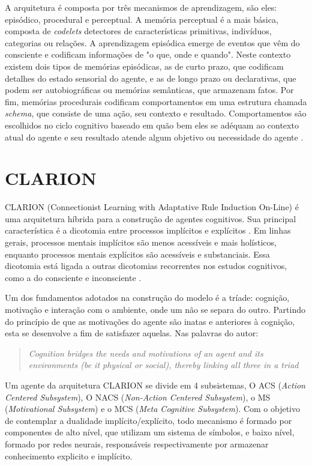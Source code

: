 A arquitetura é composta por três mecanismos de aprendizagem, são eles: episódico, procedural e perceptual. A memória perceptual é a mais básica, composta de \textit{codelets} detectores de características primitivas, indivíduos, categorias ou relações.
A aprendizagem episódica emerge de eventos que vêm do consciente e codificam informações de "o que, onde e quando". Neste contexto existem dois tipos de memórias episódicas, as de curto prazo, que codificam detalhes do estado sensorial do agente, e as de longo prazo ou declarativas, que podem ser autobiográficas ou memórias semânticas, que armazenam fatos.
Por fim, memórias procedurais codificam comportamentos em uma estrutura chamada \textit{schema}, que consiste de uma ação, seu contexto e resultado. Comportamentos são escolhidos no ciclo cognitivo baseado em quão bem eles se adéquam ao contexto atual do agente e seu resultado atende algum objetivo ou necessidade do agente \cite{Ramamurthy2006}.

\section{CLARION}
\label{sec:clarion}
CLARION (Connectionist Learning with Adaptative Rule Induction On-Line) é uma arquitetura híbrida para a construção de agentes cognitivos. Sua principal característica é a dicotomia entre processos implícitos e explícitos \cite{Sun2016}. Em linhas gerais, processos mentais implícitos são menos acessíveis e mais holísticos, enquanto processos mentais explícitos são acessíveis e substanciais. Essa dicotomia está ligada a outras dicotomias recorrentes nos estudos cognitivos, como a do consciente e inconsciente \cite{Sun2001}.

Um dos fundamentos adotados na construção do modelo é a tríade: cognição, motivação e interação com o ambiente, onde um não se separa do outro. Partindo do princípio de que as motivações do agente são inatas e anteriores à cognição, esta se desenvolve a fim de satisfazer aquelas. Nas palavras do autor: 

\begin{quote}
 \textit{Cognition bridges the needs and motivations of an agent and its environments (be it physical or social), thereby linking all three in a triad} \cite{Sun2016}
\end{quote}

Um agente da arquitetura CLARION se divide em 4 subsistemas, O ACS (\textit{Action Centered Subsystem}), O NACS (\textit{Non-Action Centered Subsystem}), o MS (\textit{Motivational Subsystem}) e o MCS (\textit{Meta Cognitive Subsystem}).  Com o objetivo de contemplar a dualidade implícito/explícito, todo mecanismo é formado por componentes de alto nível, que utilizam um sistema de símbolos, e baixo nível, formado por redes neurais, responsáveis respectivamente por armazenar conhecimento explicito e implícito. 

